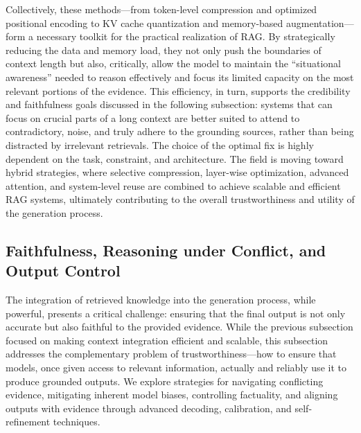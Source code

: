 \documentclass[11pt]{article}
\begin{document}
Collectively, these methods---from token-level compression and optimized positional encoding to KV cache quantization and memory-based augmentation---form a necessary toolkit for the practical realization of RAG. By strategically reducing the data and memory load, they not only push the boundaries of context length but also, critically, allow the model to maintain the ``situational awareness'' needed to reason effectively and focus its limited capacity on the most relevant portions of the evidence. This efficiency, in turn, supports the credibility and faithfulness goals discussed in the following subsection: systems that can focus on crucial parts of a long context are better suited to attend to contradictory, noise, and truly adhere to the grounding sources, rather than being distracted by irrelevant retrievals. The choice of the optimal fix is highly dependent on the task, constraint, and architecture. The field is moving toward hybrid strategies, where selective compression, layer-wise optimization, advanced attention, and system-level reuse are combined to achieve scalable and efficient RAG systems, ultimately contributing to the overall trustworthiness and utility of the generation process.

\subsection{Faithfulness, Reasoning under Conflict, and Output Control}

The integration of retrieved knowledge into the generation process, while powerful, presents a critical challenge: ensuring that the final output is not only accurate but also faithful to the provided evidence. While the previous subsection focused on making context integration efficient and scalable, this subsection addresses the complementary problem of trustworthiness---how to ensure that models, once given access to relevant information, actually and reliably use it to produce grounded outputs. We explore strategies for navigating conflicting evidence, mitigating inherent model biases, controlling factuality, and aligning outputs with evidence through advanced decoding, calibration, and self-refinement techniques.
\end{document}
